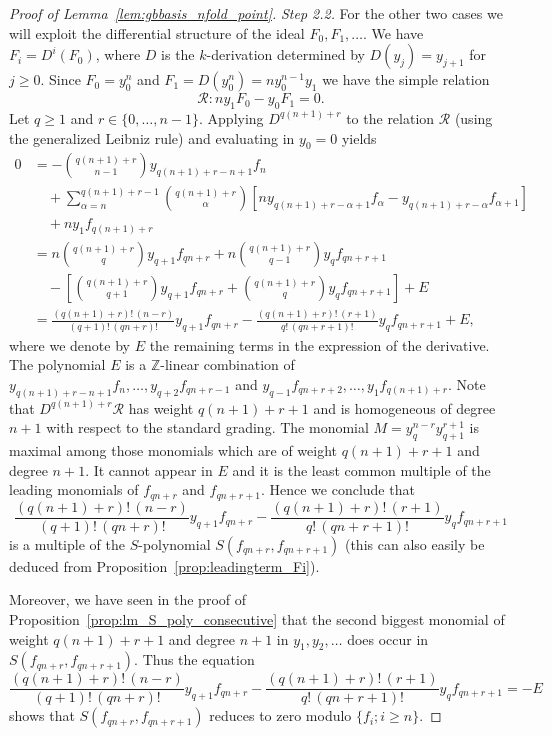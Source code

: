 \begin{proof}[Proof of Lemma~\ref{lem:gbbasis_nfold_point}]
\textit{Step 2.2.}  For the other two cases we will exploit the differential structure of the ideal
  $F_0, F_1, \dots$. We have $F_i = D^i(F_0)$, where $D$ is the $k$-derivation determined by $D(y_j) = y_{j+1}$ for $j\geq 0$. Since $F_0 = y_0^n$ and $F_1 = D(y_0^n) = ny_0^{n-1}y_1$ we have the simple
  relation 
  \begin{equation}\label{eq:basicrelation}
    \mathcal{R}\colon ny_1F_0 - y_0F_1=0.
  \end{equation}
Let $q\geq 1$ and $r\in \{0,\ldots, n-1\}$. Applying $D^{q(n+1)+r}$ to the relation $\mathcal{R}$ (using the generalized Leibniz
  rule) and evaluating in $y_0=0$ yields
\begin{align*}
  0 & = - \binom{q(n+1)+r}{n-1} y_{q(n+1)+ r - n + 1} f_{n}\\
  & \quad +  \sum_{\alpha = n}^{q(n+1)+r-1} \binom{q(n+1)+r}{\alpha} \left[n y_{q(n+1)+ r - \alpha + 1} f_{\alpha} -  y_{q(n+1)+ r - \alpha} f_{\alpha+1} \right]\\
  & \quad + n y_{1} f_{q(n+1)+r} \\
    & = n\binom{q(n+1)+r}{q} y_{q+1}f_{qn+r} +
  n\binom{q(n+1)+r}{q-1}y_{q}f_{qn+r+1}\\ & \quad - \left[\binom{q(n+1)+r}{q+1} y_{q+1}f_{qn+r} +
  \binom{q(n+1)+r}{q}y_{q}f_{qn+r+1}\right] + E\\
  & = \frac{(q(n+1)+r)!\, (n-r)}{(q+1)!\, (qn+r)!} y_{q+1}f_{qn+r} - \frac{(q(n+1)+r)!\, (r+1)}{q!\, (qn+r+1)!} y_{q}f_{qn+r+1} + E,
\end{align*}
where we denote by $E$ the remaining terms in the expression of the
derivative. The polynomial $E$ is a $\mathbb{Z}$-linear combination of
$y_{q(n+1)+ r - n + 1} f_{n},\ldots, y_{q+2}f_{qn+r-1}$ and $y_{q-1}f_{qn+r+2},\ldots, y_1f_{q(n+1)+r}$. Note that
$D^{q(n+1)+r}\mathcal{R}$ has weight $q(n+1)+r+1$ and is homogeneous of degree $n+1$
with respect to the standard grading. The monomial $M=y_q^{n-r}y_{q+1}^{r+1}$ is
maximal among those monomials which are of weight $q(n+1)+r+1$ and degree
$n+1$. It cannot appear in $E$ and it is the least common multiple of the leading monomials of $f_{qn+r}$ and $f_{qn+r+1}$. Hence we conclude that 
\[ \frac{(q(n+1)+r)!\, (n-r)}{(q+1)!\, (qn+r)!} y_{q+1}f_{qn+r} - \frac{(q(n+1)+r)!\, (r+1)}{q!\, (qn+r+1)!} y_{q}f_{qn+r+1} \]
is a multiple of the $S$-polynomial $S(f_{qn+r},f_{qn+r+1})$ (this can also easily be deduced from Proposition~\ref{prop:leadingterm_Fi}).

Moreover, we have seen in the proof of Proposition~\ref{prop:lm_S_poly_consecutive} that the second biggest monomial of weight $q(n+1)+r+1$ and degree $n+1$ in $y_1,y_2,\ldots$ does occur in $S(f_{qn+r},f_{qn+r+1})$. Thus the equation
\[  \frac{(q(n+1)+r)!\, (n-r)}{(q+1)!\, (qn+r)!} y_{q+1}f_{qn+r} - \frac{(q(n+1)+r)!\, (r+1)}{q!\, (qn+r+1)!} y_{q}f_{qn+r+1} = - E \]
shows that $S(f_{qn+r},f_{qn+r+1})$ reduces to zero modulo $\{f_i; i\geq n\}$. 


\end{proof}
